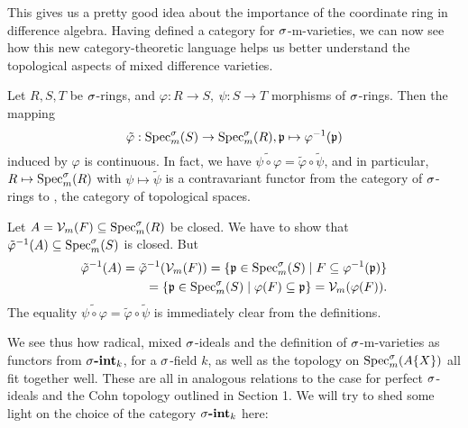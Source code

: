 This gives us a pretty good idea about the importance of the coordinate ring in difference algebra.
Having defined a category for $\sigma$-m-varieties, we can now see how this new category-theoretic language helps us better understand the topological aspects of mixed difference varieties.

\begin{lem}\label{inducedcont}
Let $R,S,T$ be $\sigma$-rings, and $\varphi: R \rightarrow S,~ \psi: S \rightarrow T$ morphisms of $\sigma$-rings. Then the mapping $$\tilde \varphi: \operatorname{Spec}^\sigma_m(S) \rightarrow \operatorname{Spec}^\sigma_m(R), \mathfrak{p} \mapsto \varphi^{-1}(\mathfrak{p})$$ 
induced by $\varphi$ is continuous. 
In fact, we have $\widetilde{ \psi \circ \varphi} = \tilde \varphi \circ \tilde \psi$, and in particular, $R \mapsto \operatorname{Spec}^\sigma_m(R)$ with $\psi \mapsto\tilde \psi$ is a contravariant functor from the category of $\sigma$-rings to \Top, the category of topological spaces.
\begin{bew}
Let $A = \mathcal{V}_m(F) \subseteq \operatorname{Spec}^\sigma_m(R)$ be closed. We have to show that $\tilde \varphi^{-1}(A) \subseteq \operatorname{Spec}^\sigma_m(S)$ is closed.
But 
\begin{align*} \tilde \varphi^{-1}(A) = \tilde \varphi^{-1}(\mathcal{V}_m(F)) = \{ \mathfrak{p} \in \operatorname{Spec}^\sigma_m(S) \mid F \subseteq \varphi^{-1}(\mathfrak{p}) \} \\ = \{\mathfrak{p} \in \operatorname{Spec}^\sigma_m(S) \mid \varphi(F) \subseteq \mathfrak{p} \} = \mathcal{V}_m(\varphi(F)). \end{align*}
The equality $\widetilde{ \psi \circ \varphi} = \tilde \varphi \circ \tilde \psi$ is immediately clear from the definitions.
\end{bew}
\end{lem}

We see thus how radical, mixed $\sigma$-ideals and the definition of $\sigma$-m-varieties as functors from $\sigma\text{{\normalfont\textbf{-int}}}_k$, for a $\sigma$-field $k$, as well as the topology on $\operatorname{Spec}^\sigma_m(A\{X\})$ all fit together well. 
These are all in analogous relations to the case for perfect $\sigma$-ideals and the Cohn topology outlined in Section 1. We will try to shed some light on the choice of the category $\sigma\text{{\normalfont\textbf{-int}}}_k$ here:

